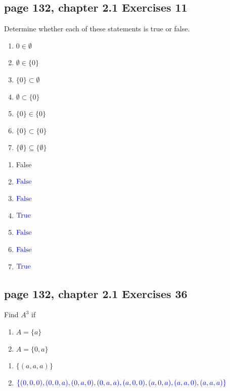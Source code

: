 \documentclass[sigconf]{acmart}
\newcommand{\answer}[2]{%
  \if\relax\detokenize{#2}\relax
    \underline{\mbox{請作答}}%
  \else
    \textcolor{blue}{#2}%
  \fi
}
\begin{document}
\subsection{page 132, chapter 2.1 Exercises 11}
\begin{shaded}
    Determine whether each of these statements is true or false.
    \begin{enumerate}[label=(\alph*)]
    	\item $0 \in \emptyset$
    	\item $\emptyset \in \{0\}$
            \item $\{0\} \subset \emptyset$
            \item $\emptyset \subset \{0\}$
            \item $\{0\} \in \{0\}$
            \item $\{0\} \subset \{0\}$
            \item $\{\emptyset\} \subseteq \{\emptyset\}$
    \end{enumerate}
\end{shaded}  
\begin{enumerate}[label=(\alph*)]
	\item False
    \item $\answer{2.1.11b}{\text{False}}$
    \item $\answer{2.1.11c}{\text{False}}$
    \item $\answer{2.1.11d}{\text{True}}$
    \item $\answer{2.1.11e}{\text{False}}$
    \item $\answer{2.1.11f}{\text{False}}$
    \item $\answer{2.1.11g}{\text{True}}$
\end{enumerate}

\subsection{page 132, chapter 2.1 Exercises 36}
\begin{shaded}
    Find $A^3$ if
    \begin{enumerate}[label=(\alph*)]
    	\item $A = \{a\}$
    	\item $A = \{0, a\}$
    \end{enumerate}
\end{shaded}  
\begin{enumerate}[label=(\alph*)]
	\item $\{(a, a, a)\}$
	\item $\answer{2.1.36b}{\{(0,0,0),(0,0,a),(0,a,0),(0,a,a),(a,0,0),(a,0,a),(a,a,0),(a,a,a)\}}$
\end{enumerate}
\end{document}

